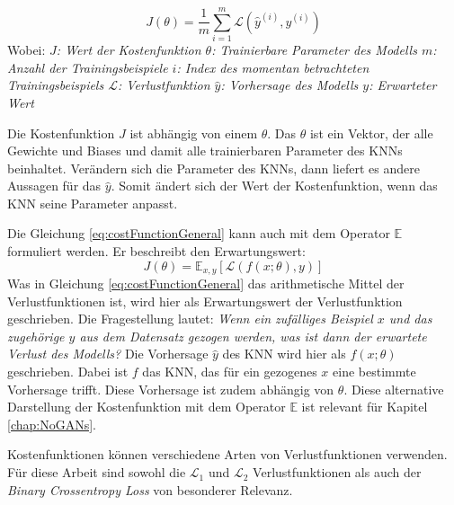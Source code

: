 \begin{equation}
   \label{eq:costFunctionGeneral}
   J(\theta) = \frac{1}{m} \sum_{i=1}^{m} \mathcal{L}(\hat{y}^{(i)}, y^{(i)})
\end{equation}
Wobei: \newline
\emph{\null\quad\quad $J$: Wert der Kostenfunktion \newline
\null\quad\quad $\theta$: Trainierbare Parameter des Modells \newline
\null\quad\quad $m$: Anzahl der Trainingsbeispiele \newline
\null\quad\quad $i$: Index des momentan betrachteten Trainingsbeispiels \newline
\null\quad\quad $\mathcal{L}$: Verlustfunktion \newline
\null\quad\quad $\hat{y}$: Vorhersage des Modells \newline
\null\quad\quad $y$: Erwarteter Wert}

Die Kostenfunktion $J$ ist abhängig von einem $\theta$. Das $\theta$ ist ein Vektor, der alle Gewichte und Biases und damit alle trainierbaren Parameter des \acp{KNN} beinhaltet. Verändern sich die Parameter des \acp{KNN}, dann liefert es andere Aussagen für das $\hat{y}$. Somit ändert sich der Wert der Kostenfunktion, wenn das \ac{KNN} seine Parameter anpasst.  \cite{DeepLearningBook}

Die Gleichung \ref{eq:costFunctionGeneral} kann auch mit dem Operator $\mathbb{E}$ formuliert werden. Er beschreibt den Erwartungswert: \cite{DeepLearningBook}
\begin{equation}
	\label{eq:costFunctionExpectedValue}
	J(\theta) = \mathbb{E}_{x,y}[\mathcal{L}(f(x; \theta), y)]
\end{equation}
Was in Gleichung \ref{eq:costFunctionGeneral} das arithmetische Mittel der Verlustfunktionen ist, wird hier als Erwartungswert der Verlustfunktion geschrieben. Die Fragestellung lautet: \emph{Wenn ein zufälliges Beispiel $x$ und das zugehörige $y$ aus dem Datensatz gezogen werden, was ist dann der erwartete Verlust des Modells?} Die Vorhersage $\hat{y}$ des \ac{KNN} wird hier als $f(x; \theta)$ geschrieben. Dabei ist $f$ das \ac{KNN}, das für ein gezogenes $x$ eine bestimmte Vorhersage trifft. Diese Vorhersage ist zudem abhängig von $\theta$. Diese alternative Darstellung der Kostenfunktion mit dem Operator $\mathbb{E}$ ist relevant für Kapitel \ref{chap:NoGANs}. \cite{DeepLearningBook}

Kostenfunktionen können verschiedene Arten von Verlustfunktionen verwenden. Für diese Arbeit sind sowohl die $\mathcal{L}_1$ und $\mathcal{L}_2$ Verlustfunktionen als auch der \emph{Binary Crossentropy Loss} von besonderer Relevanz.

